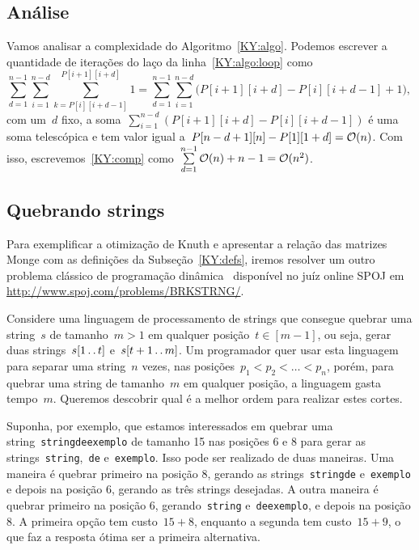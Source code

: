 
\subsection{Análise}

Vamos analisar a complexidade do Algoritmo~\ref{KY:algo}. Podemos escrever a quantidade de iterações do laço da linha~\ref{KY:algo:loop} como
\begin{equation} \label{KY:comp}
{\sum\limits_{d = 1}^{n-1} \sum\limits_{i=1}^{n-d} \sum\limits_{k=P[i][i+d-1]}^{P[i+1][i+d]} 1 = \sum\limits_{d = 1}^{n-1} \sum\limits_{i=1}^{n-d} ( P[i+1][i+d] - P[i][i+d-1] + 1} ) \text{, }
\end{equation}
com um~$d$ fixo, a soma~$\sum\limits_{i=1}^{n-d} ( P[i+1][i+d] - P[i][i+d-1] )$ é uma soma telescópica e tem valor igual a~$P[n-d+1][n] - P[1][1+d] = \mathcal{O}(n)$. Com isso, escrevemos~\eqref{KY:comp} como~$\sum\limits_{d=1}^{n-1} \mathcal{O}(n) + n - 1 = \mathcal{O}(n^2)$.


\subsection{Quebrando strings}

Para exemplificar a otimização de Knuth e apresentar a relação das matrizes Monge com as definições da Subseção~\ref{KY:defs}, iremos resolver um outro problema clássico de programação dinâmica~\cite[Exercício~15-9]{CLRS} disponível no juíz online SPOJ em \url{http://www.spoj.com/problems/BRKSTRNG/}. 

Considere uma linguagem de processamento de strings que consegue quebrar uma string~$s$ de tamanho~$m > 1$ em qualquer posição~$t \in [m-1]$, ou seja, gerar duas strings~$s[1 \,.\,.\, t]$ e~$s[t+1 \,.\,.\, m]$. Um programador quer usar esta linguagem para separar uma string~$n$ vezes, nas posições~${p_1 < p_2 < \dots < p_{n}}$, porém, para quebrar uma string de tamanho~$m$ em qualquer posição, a linguagem gasta tempo~$m$. Queremos descobrir qual é a melhor ordem para realizar estes cortes. 

Suponha, por exemplo, que estamos interessados em quebrar uma string~\texttt{stringdeexemplo} de tamanho 15 nas posições 6 e 8 para gerar as strings~\texttt{string},~\texttt{de} e~\texttt{exemplo}. Isso pode ser realizado de duas maneiras. Uma maneira é quebrar primeiro na posição 8, gerando as strings~\texttt{stringde} e~\texttt{exemplo} e depois na posição 6, gerando as três strings desejadas. A outra maneira é quebrar primeiro na posição 6, gerando~\texttt{string} e~\texttt{deexemplo}, e depois na posição 8. A primeira opção tem custo~$15 + 8$, enquanto a segunda tem custo~$15 + 9$, o que faz a resposta ótima ser a primeira alternativa.

